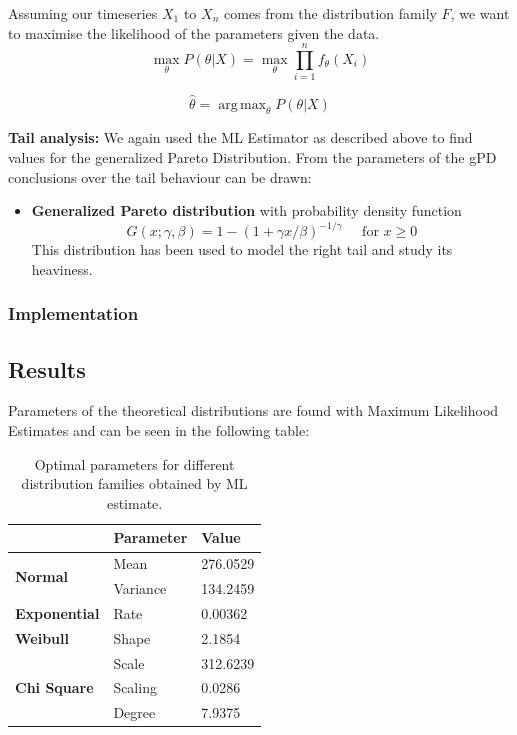 \documentclass[11pt]{article}
\DeclareMathOperator*{\argmax}{arg\,max}
\begin{document}
Assuming our timeseries $X_1$ to $X_n$ comes from the distribution family $F$, we want to maximise the likelihood of the parameters given the data.
$$
\max_{\theta} P(\theta | X) = \max_{\theta} \prod_{i=1}^{n} f_\theta(X_i)
$$

$$
\hat{\theta} = \argmax_{\theta} P(\theta | X)
$$

\textbf{Tail analysis:} We again used the ML Estimator as described above to find values for the generalized Pareto Distribution. From the parameters of the gPD conclusions over the tail behaviour can be drawn:

\begin{itemize}


    \item \textbf{Generalized Pareto distribution}
    with probability density function
    \[
     G(x;\gamma, \beta) = 1-(1+\gamma x/\beta)^{-1/\gamma}\;\;\;\;\; \text{for } x \geq 0
    \]
    This distribution has been used to model the right tail and study its heaviness.
    
    
\end{itemize}


\subsubsection*{Implementation}






\subsection*{Results}

Parameters of the theoretical distributions are found with Maximum Likelihood Estimates and can be seen in the following table:
\begin{table}[H]
\centering
\begin{tabular}{lll}
                                 & \textbf{Parameter} & \textbf{Value} \\
\hline
\multirow{2}{*}{\textbf{Normal}} & Mean               & 276.0529       \\
                                 & Variance           & 134.2459       \\
\hline
\textbf{Exponential}                      & Rate               & 0.00362        \\
\hline
\textbf{Weibull}                          & Shape              & 2.1854         \\
                                 & Scale              & 312.6239       \\
\hline
\textbf{Chi Square}                       & Scaling            & 0.0286         \\
                                 & Degree             & 7.9375        \\
\hline
\end{tabular}
\caption{Optimal parameters for different distribution families obtained by ML estimate.}
\end{table}
\end{document}
